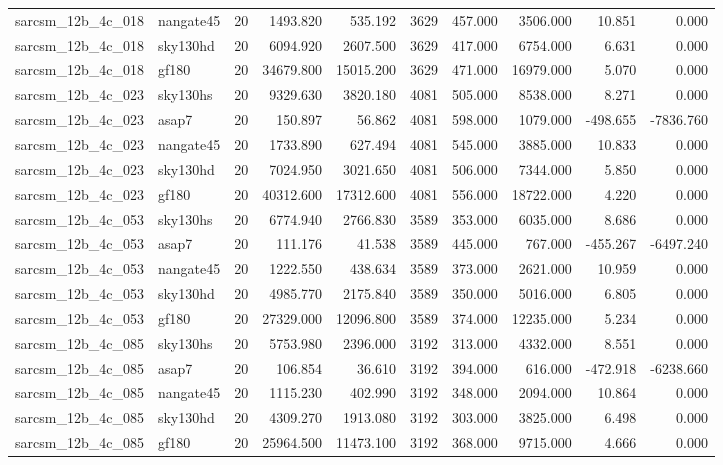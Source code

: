 \documentclass{article}
\begin{document}
\begin{longtable}{llrrrrrrrr}
sarcsm\_12b\_4c\_018 & nangate45 & 20 & 1493.820 & 535.192 & 3629 & 457.000 & 3506.000 & 10.851 & 0.000 \\
sarcsm\_12b\_4c\_018 & sky130hd & 20 & 6094.920 & 2607.500 & 3629 & 417.000 & 6754.000 & 6.631 & 0.000 \\
sarcsm\_12b\_4c\_018 & gf180 & 20 & 34679.800 & 15015.200 & 3629 & 471.000 & 16979.000 & 5.070 & 0.000 \\
sarcsm\_12b\_4c\_023 & sky130hs & 20 & 9329.630 & 3820.180 & 4081 & 505.000 & 8538.000 & 8.271 & 0.000 \\
sarcsm\_12b\_4c\_023 & asap7 & 20 & 150.897 & 56.862 & 4081 & 598.000 & 1079.000 & -498.655 & -7836.760 \\
sarcsm\_12b\_4c\_023 & nangate45 & 20 & 1733.890 & 627.494 & 4081 & 545.000 & 3885.000 & 10.833 & 0.000 \\
sarcsm\_12b\_4c\_023 & sky130hd & 20 & 7024.950 & 3021.650 & 4081 & 506.000 & 7344.000 & 5.850 & 0.000 \\
sarcsm\_12b\_4c\_023 & gf180 & 20 & 40312.600 & 17312.600 & 4081 & 556.000 & 18722.000 & 4.220 & 0.000 \\
sarcsm\_12b\_4c\_053 & sky130hs & 20 & 6774.940 & 2766.830 & 3589 & 353.000 & 6035.000 & 8.686 & 0.000 \\
sarcsm\_12b\_4c\_053 & asap7 & 20 & 111.176 & 41.538 & 3589 & 445.000 & 767.000 & -455.267 & -6497.240 \\
sarcsm\_12b\_4c\_053 & nangate45 & 20 & 1222.550 & 438.634 & 3589 & 373.000 & 2621.000 & 10.959 & 0.000 \\
sarcsm\_12b\_4c\_053 & sky130hd & 20 & 4985.770 & 2175.840 & 3589 & 350.000 & 5016.000 & 6.805 & 0.000 \\
sarcsm\_12b\_4c\_053 & gf180 & 20 & 27329.000 & 12096.800 & 3589 & 374.000 & 12235.000 & 5.234 & 0.000 \\
sarcsm\_12b\_4c\_085 & sky130hs & 20 & 5753.980 & 2396.000 & 3192 & 313.000 & 4332.000 & 8.551 & 0.000 \\
sarcsm\_12b\_4c\_085 & asap7 & 20 & 106.854 & 36.610 & 3192 & 394.000 & 616.000 & -472.918 & -6238.660 \\
sarcsm\_12b\_4c\_085 & nangate45 & 20 & 1115.230 & 402.990 & 3192 & 348.000 & 2094.000 & 10.864 & 0.000 \\
sarcsm\_12b\_4c\_085 & sky130hd & 20 & 4309.270 & 1913.080 & 3192 & 303.000 & 3825.000 & 6.498 & 0.000 \\
sarcsm\_12b\_4c\_085 & gf180 & 20 & 25964.500 & 11473.100 & 3192 & 368.000 & 9715.000 & 4.666 & 0.000 \\

\end{longtable}
\end{document}
